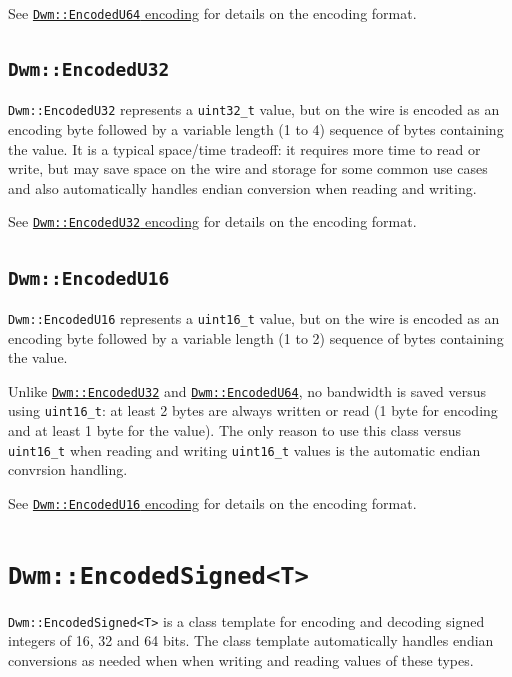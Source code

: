 See \hyperref[encoding:DwmEncodedU64]{\texttt{Dwm::EncodedU64}
 encoding} for details on the encoding format.

\subsection{\texttt{Dwm::EncodedU32}}\label{class:EncodedU32}
\texttt{Dwm::EncodedU32} represents a \texttt{uint32\_t} value, but
on the wire is encoded as an encoding byte followed by a variable
length (1 to 4) sequence of bytes containing the value.  It is a
typical space/time tradeoff: it requires more time to read or write,
but may save space on the wire and storage for some common use cases
and also automatically handles endian conversion when reading and
writing.

See \hyperref[encoding:DwmEncodedU32]{\texttt{Dwm::EncodedU32}
 encoding} for details on the encoding format.

\subsection{\texttt{Dwm::EncodedU16}}\label{class:EncodedU16}
\texttt{Dwm::EncodedU16} represents a \texttt{uint16\_t} value, but
on the wire is encoded as an encoding byte followed by a variable
length (1 to 2) sequence of bytes containing the value.

Unlike \hyperref[class:EncodedU32]{\texttt{Dwm::EncodedU32}} and
\hyperref[class:EncodedU64]{\texttt{Dwm::EncodedU64}}, no bandwidth
is saved versus using \texttt{uint16\_t}: at least 2 bytes are
always written or read (1 byte for encoding and at least 1 byte
for the value).  The only reason to use this class versus
\texttt{uint16\_t} when reading and writing \texttt{uint16\_t}
values is the automatic endian convrsion handling.

See \hyperref[encoding:DwmEncodedU16]{\texttt{Dwm::EncodedU16}
 encoding} for details on the encoding format.

\section{\texttt{Dwm::EncodedSigned<T>}}\label{classtmpl:EncodedSigned}
\texttt{Dwm::EncodedSigned<T>} is a class template for encoding
and decoding signed integers of 16, 32 and 64 bits.  The class
template automatically handles endian conversions as needed when
when writing and reading values of these types.
\vspace{1ex}


